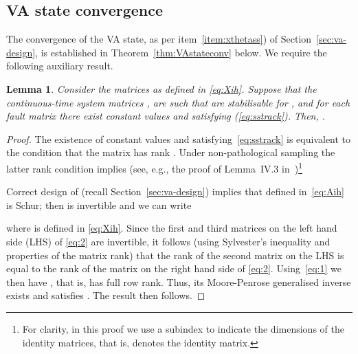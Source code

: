 \documentclass[letterpaper, 10 pt, conference]{ieeeconf}
\newtheorem{lem}{Lemma}
\begin{document}
\subsection{VA state convergence}
\label{sec:const-ss-vsr}
The convergence of the VA state, as per item~\ref{item:xthetass}) of
Section~\ref{sec:va-design}, is established in
Theorem~\ref{thm:VAstateconv} below. We require the following
auxiliary result.
\begin{lem}
  \label{lem:nihprops}
  Consider the matrices  as defined in \eqref{eq:Xih}. Suppose
  that the continuous-time system matrices ,  are such that
   are stabilisable for , and for each
  fault matrix  there exist constant values  and  satisfying (\ref{eq:sstrack}). Then, .
\end{lem}
\begin{proof} The existence of constant values  and  satisfying~\eqref{eq:sstrack} is equivalent to the condition
  that the matrix  has rank .  Under non-pathological sampling  the latter rank condition implies (see, e.g., the
  proof of Lemma~IV.3 in~\cite{jemdav_tac03})\footnote{For clarity, in
    this proof we use a subindex to indicate the dimensions of the
    identity matrices, that is,  denotes the  identity
    matrix.}
  
  Correct design of  (recall Section~\ref{sec:va-design})
  implies that  defined in~\eqref{eq:Aih} is Schur; then
   is invertible and we can write
  
  where  is defined in
  \eqref{eq:Xih}.  Since the first and third matrices on the left hand
  side (LHS) of \eqref{eq:2} are invertible, it follows (using
  Sylvester's inequality and properties of the matrix rank) that the
  rank of the second matrix on the LHS is equal to the rank of the
  matrix on the right hand side of \eqref{eq:2}.  Using~\eqref{eq:1}
  we then have , that is,  has full
  row rank.  Thus, its Moore-Penrose generalised inverse
   exists
  and satisfies . The result
  then follows.
\end{proof}
\vspace{5mm} 
\end{document}
